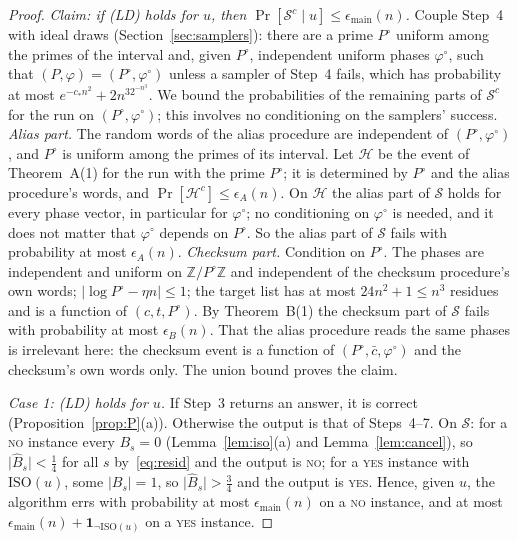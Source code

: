 \documentclass[11pt]{article}
\theoremstyle{definition}
\newcommand{\Z}{\mathbb Z}
\newcommand{\bc}{\bar c}
\newcommand{\abs}[1]{\lvert #1\rvert}
\begin{document}
\begin{proof}
\emph{Claim: if \textup{(LD)} holds for $u$, then $\Pr[\mathcal S^c\mid u]\le\epsilon_{\mathrm{main}}(n)$.} Couple
Step~4 with ideal draws (Section~\ref{sec:samplers}): there are a prime $P^\circ$ uniform among the primes of the
interval and, given $P^\circ$, independent uniform phases $\varphi^\circ$, such that $(P,\varphi)=(P^\circ,\varphi^\circ)$
unless a sampler of Step~4 fails, which has probability at most $e^{-c_\ast n^2}+2n^32^{-n^3}$. We bound the
probabilities of the remaining parts of $\mathcal S^c$ for the run on $(P^\circ,\varphi^\circ)$; this involves no
conditioning on the samplers' success. \emph{Alias part.} The random words of the alias procedure are independent
of $(P^\circ,\varphi^\circ)$, and $P^\circ$ is uniform among the primes of its interval. Let $\mathcal H$ be the
event of Theorem~A(1) for the run with the prime $P^\circ$; it is determined by $P^\circ$ and the alias
procedure's words, and $\Pr[\mathcal H^c]\le\epsilon_A(n)$. On $\mathcal H$ the alias part of $\mathcal S$ holds
for every phase vector, in particular for $\varphi^\circ$; no conditioning on $\varphi^\circ$ is needed, and it
does not matter that $\varphi^\circ$ depends on $P^\circ$. So the alias part of $\mathcal S$ fails
with probability at most $\epsilon_A(n)$. \emph{Checksum part.} Condition on $P^\circ$. The phases are independent
and uniform on $\Z/P^\circ\Z$ and independent of the checksum procedure's own words; $\abs{\log P^\circ-\eta n}\le1$;
the target list has at most $24n^2+1\le n^3$ residues and is a function of $(c,t,P^\circ)$. By
Theorem~B(1) the checksum part of $\mathcal S$ fails with probability at most $\epsilon_B(n)$. That the
alias procedure reads the same phases is irrelevant here: the checksum event is a function of
$(P^\circ,\bc,\varphi^\circ)$ and the checksum's own words only. The union bound proves the claim.

\emph{Case 1: \textup{(LD)} holds for $u$.} If Step~3 returns an answer, it is correct
(Proposition~\ref{prop:P}(a)). Otherwise the output is that of Steps~4--7. On $\mathcal S$: for a \textsc{no}
instance every $B_s=0$ (Lemma~\ref{lem:iso}(a) and Lemma~\ref{lem:cancel}), so $\abs{\hat B_s}<\tfrac14$ for all $s$
by~\eqref{eq:resid} and the output is \textsc{no}; for a \textsc{yes} instance with $\mathrm{ISO}(u)$, some
$\abs{B_s}=1$, so $\abs{\hat B_s}>\tfrac34$ and the output is \textsc{yes}. Hence, given $u$, the algorithm errs with
probability at most $\epsilon_{\mathrm{main}}(n)$ on a \textsc{no} instance, and at most
$\epsilon_{\mathrm{main}}(n)+\mathbf 1_{\neg\mathrm{ISO}(u)}$ on a \textsc{yes} instance.


\end{proof}
\end{document}
